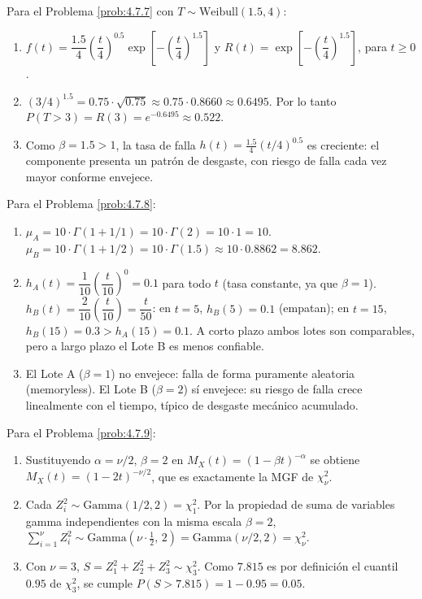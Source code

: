 \begin{solucion}
	\label{sol:4.7.7}
	Para el Problema \ref{prob:4.7.7} con $T \sim \text{Weibull}(1.5,4)$:
	\begin{enumerate}
		\item $f(t) = \dfrac{1.5}{4}\left(\dfrac{t}{4}\right)^{0.5}\exp\!\left[-\left(\dfrac{t}{4}\right)^{1.5}\right]$ y $R(t) = \exp\!\left[-\left(\dfrac{t}{4}\right)^{1.5}\right]$, para $t\ge 0$.
		\item $(3/4)^{1.5} = 0.75\cdot\sqrt{0.75} \approx 0.75\cdot 0.8660 \approx 0.6495$. Por lo tanto $P(T>3) = R(3) = e^{-0.6495} \approx 0.522$.
		\item Como $\beta=1.5>1$, la tasa de falla $h(t) = \frac{1.5}{4}(t/4)^{0.5}$ es creciente: el componente presenta un patrón de desgaste, con riesgo de falla cada vez mayor conforme envejece. \quad \qedhere
	\end{enumerate}
\end{solucion}

\begin{solucion}
	\label{sol:4.7.8}
	Para el Problema \ref{prob:4.7.8}:
	\begin{enumerate}
		\item $\mu_A = 10\cdot\Gamma(1+1/1) = 10\cdot\Gamma(2) = 10\cdot 1 = 10$. $\mu_B = 10\cdot\Gamma(1+1/2) = 10\cdot\Gamma(1.5) \approx 10\cdot 0.8862 = 8.862$.
		\item $h_A(t) = \dfrac{1}{10}\left(\dfrac{t}{10}\right)^{0} = 0.1$ para todo $t$ (tasa constante, ya que $\beta=1$). $h_B(t) = \dfrac{2}{10}\left(\dfrac{t}{10}\right) = \dfrac{t}{50}$: en $t=5$, $h_B(5)=0.1$ (empatan); en $t=15$, $h_B(15)=0.3 > h_A(15)=0.1$. A corto plazo ambos lotes son comparables, pero a largo plazo el Lote B es menos confiable.
		\item El Lote A ($\beta=1$) no envejece: falla de forma puramente aleatoria (memoryless). El Lote B ($\beta=2$) sí envejece: su riesgo de falla crece linealmente con el tiempo, típico de desgaste mecánico acumulado. \quad \qedhere
	\end{enumerate}
\end{solucion}

\begin{solucion}
	\label{sol:4.7.9}
	Para el Problema \ref{prob:4.7.9}:
	\begin{enumerate}
		\item Sustituyendo $\alpha=\nu/2$, $\beta=2$ en $M_X(t)=(1-\beta t)^{-\alpha}$ se obtiene $M_X(t) = (1-2t)^{-\nu/2}$, que es exactamente la MGF de $\chi^{2}_{\nu}$.
		\item Cada $Z_i^{2} \sim \text{Gamma}(1/2,2) = \chi^{2}_{1}$. Por la propiedad de suma de variables gamma independientes con la misma escala $\beta=2$, $\sum_{i=1}^{\nu} Z_i^{2} \sim \text{Gamma}\!\left(\nu\cdot\tfrac{1}{2},\,2\right) = \text{Gamma}(\nu/2,2) = \chi^{2}_{\nu}$.
		\item Con $\nu=3$, $S=Z_1^{2}+Z_2^{2}+Z_3^{2}\sim\chi^{2}_{3}$. Como $7.815$ es por definición el cuantil $0.95$ de $\chi^{2}_{3}$, se cumple $P(S>7.815) = 1-0.95 = 0.05$. \quad \qedhere
	\end{enumerate}
\end{solucion}

